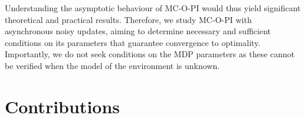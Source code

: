 \newpage
Understanding the asymptotic behaviour of MC-O-PI would thus 
yield significant theoretical and practical results.
Therefore, we study MC-O-PI with asynchronous noisy updates, aiming to determine necessary and sufficient conditions on its parameters that guarantee convergence to optimality.
Importantly, we do not seek conditions on the MDP parameters as these cannot be verified when the model of the environment is unknown.








\section{Contributions}


